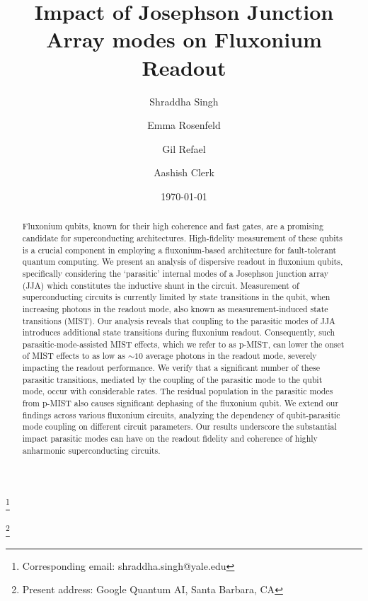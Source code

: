 \documentclass[%
reprint,
superscriptaddress,
 amsmath,amssymb,
 aps,
 prx,
longbibliography,
floatfix,
]{revtex4-2}
\begin{document}
\title{Impact of Josephson Junction Array modes on Fluxonium Readout}

\author{Shraddha Singh}\thanks{Corresponding email: shraddha.singh@yale.edu}
\author{Emma Rosenfeld}\thanks{Present address: Google Quantum AI, Santa Barbara, CA}
\author{Gil Refael}
\author{Aashish Clerk}
\date{\today}%

\begin{abstract}
Fluxonium qubits, known for their high coherence and fast gates, are a promising candidate for superconducting architectures. High-fidelity measurement of these qubits is a crucial component in employing a fluxonium-based architecture for fault-tolerant quantum computing. We present an analysis of dispersive readout in fluxonium qubits, specifically considering the `parasitic' internal modes of a Josephson junction array (JJA) which constitutes the inductive shunt in the circuit. %
Measurement of superconducting circuits is currently limited by state transitions in the qubit, when increasing photons in the readout mode, also known as measurement-induced state transitions (MIST). 
Our analysis reveals that coupling to the parasitic modes of JJA introduces additional state transitions during fluxonium readout. Consequently, such parasitic-mode-assisted MIST effects, which we refer to as p-MIST, can lower the onset of MIST effects to as low as $\sim 10$ average photons in the readout mode, severely impacting the readout performance. %
We verify that a significant number of these parasitic transitions, mediated by the coupling of the parasitic mode to the qubit mode, occur with considerable rates. %
The residual population in the parasitic modes from p-MIST also causes significant dephasing of the fluxonium qubit. We extend our findings across various fluxonium circuits, analyzing the dependency of qubit-parasitic mode coupling on different circuit parameters. Our results underscore the substantial impact parasitic modes can have on the readout fidelity and coherence of highly anharmonic superconducting circuits.
\end{abstract}
\maketitle
\end{document}
